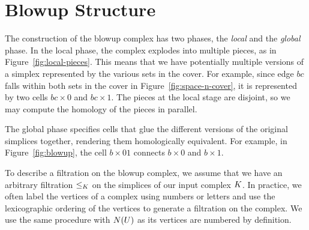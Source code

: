 \documentclass{jocg}
\begin{document}
\section{Blowup Structure}
\label{sec:blowup_structure}
The construction of the blowup complex has two phases,  the \emph{local} and the
 \emph{global} phase. In the local phase, the complex explodes into multiple 
pieces, as in Figure~\ref{fig:local-pieces}. This means that we have potentially multiple versions of a simplex 
represented by the various sets in the cover. For example, since edge $bc$ falls within both sets in the 
cover in Figure~\ref{fig:space-n-cover}, it is represented by two cells 
$bc \times 0$ and $bc \times 1$. The pieces at the local stage are disjoint, so 
we may compute the homology of the pieces in parallel. 

The global phase specifies cells that glue the different versions of the 
original simplices together, rendering them homologically equivalent.  
For example, in Figure~\ref{fig:blowup}, the cell 
$b \times 01$ connects $b \times 0$ and $b \times 1$.  

To describe a filtration on the blowup complex, we assume that we have an 
arbitrary filtration $\leq_{K}$ on the simplices of our input complex $K$.  In practice, 
we often label the vertices of a complex using numbers or letters and use the lexicographic 
ordering of the vertices to generate a filtration on the complex. We use the same procedure 
with $N(U)$ as its vertices are numbered by definition.
\end{document}
